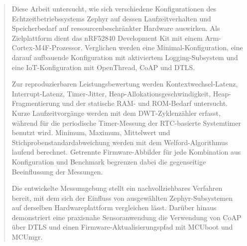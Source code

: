 \renewcommand{\abstractname}{Zusammenfassung}
\begin{abstract}
	\addchaptertocentry{\abstractname} %

	Diese Arbeit untersucht, wie sich verschiedene Konfigurationen des
	Echtzeitbetriebssystems Zephyr auf dessen Laufzeitverhalten und
	Speicherbedarf auf ressourcenbeschr\"ankter Hardware auswirken. Als
	Zielplattform dient das nRF52840 Development Kit mit einem
	Arm-Cortex-M4F-Prozessor. Verglichen werden eine Minimal-Konfiguration, eine
	darauf aufbauende Konfiguration mit aktiviertem Logging-Subsystem und eine
	IoT-Konfiguration mit OpenThread, CoAP und DTLS.

	Zur reproduzierbaren Leistungsbewertung werden Kontextwechsel-Latenz,
	Interrupt-Latenz, Timer-Jitter, Heap-Allokationsgeschwindigkeit,
	Heap-Fragmentierung und der statische RAM- und ROM-Bedarf untersucht. Kurze
	Laufzeitvorg\"ange werden mit dem DWT-Zyklenz\"ahler erfasst, w\"ahrend f\"ur
	die periodische Timer-Messung der RTC-basierte Systemtimer benutzt wird.
	Minimum, Maximum, Mittelwert und Stichprobenstandardabweichung werden mit dem
	Welford-Algorithmus laufend berechnet. Getrennte Firmware-Abbilder f\"ur jede
	Kombination aus Konfiguration und Benchmark begrenzen dabei die gegenseitige
	Beeinflussung der Messungen.

	Die entwickelte Messumgebung stellt ein nachvollziehbares Verfahren bereit,
	mit dem sich der Einfluss von ausgew\"ahlten Zephyr-Subsystemen auf derselben
	Hardwareplattform vergleichen l\"asst. Dar\"uber hinaus demonstriert eine
	praxisnahe Sensoranwendung die Verwendung von CoAP \"uber DTLS und einen
	Firmware-Aktualisierungspfad mit MCUboot und MCUmgr.
\end{abstract}

